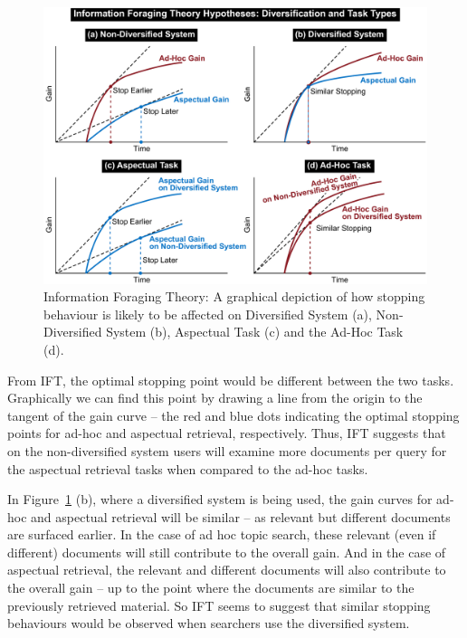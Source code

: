 \begin{figure}[t!]
\begin{center}
        \includegraphics[width=\textwidth]{figures/ift-non-div-fromthesis.pdf}
        \vspace{-2mm}
    \caption{Information Foraging Theory: A graphical depiction of how stopping behaviour is likely to be affected on Diversified System (a), Non-Diversified System (b), Aspectual Task (c) and the Ad-Hoc Task (d).} \label{fig_ift_patches}    
    \vspace{-6mm}
\end{center}
\end{figure}


From IFT, the optimal stopping point would be different between the two tasks. Graphically we can find this point by drawing a line from the origin to the tangent of the gain curve -- the red and blue dots indicating the optimal stopping points for ad-hoc and aspectual retrieval, respectively. Thus, IFT suggests that on the non-diversified system users will examine more documents per query for the aspectual retrieval tasks when compared to the ad-hoc tasks.

In Figure~\ref{fig_ift_patches} (b), where a diversified system is being used, the gain curves for ad-hoc and aspectual retrieval will be similar -- as relevant but different documents are surfaced earlier. In the case of ad hoc topic search, these relevant (even if different) documents will still contribute to the overall gain. And in the case of aspectual retrieval, the relevant and different documents will also contribute to the overall gain -- up to the point where the documents are similar to the previously retrieved material. So IFT seems to suggest that similar stopping behaviours would be observed when searchers use the diversified system. 

